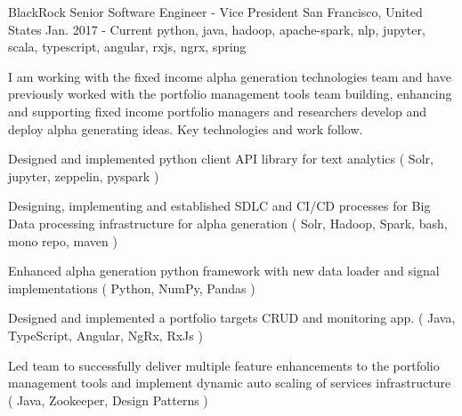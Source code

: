 \cventry
    {BlackRock} %
    {Senior Software Engineer - Vice President} %
    {San Francisco, United States} %
    {Jan. 2017 - Current} %
    { python, java, hadoop, apache-spark, nlp, jupyter, scala, typescript, angular, rxjs, ngrx, spring} %
    {
        I am working with the fixed income alpha generation technologies team and have previously worked with the portfolio management tools team building,
        enhancing and supporting fixed income portfolio managers and researchers develop and deploy alpha generating ideas. Key technologies and work follow.
    \begin{cvitems} %
        \item { Designed and implemented python client API library for text analytics ( Solr, jupyter, zeppelin, pyspark )}
        \item { Designing, implementing and established SDLC and CI/CD processes for Big Data processing infrastructure for alpha generation ( Solr, Hadoop, Spark,
        bash, mono repo, maven ) }
        \item { Enhanced alpha generation python framework with new data loader and signal implementations ( Python, NumPy, Pandas )}
        \item { Designed and implemented a portfolio targets CRUD and monitoring app. ( Java, TypeScript, Angular, NgRx, RxJs )  }
        \item { Led team to successfully deliver multiple feature enhancements to the portfolio management tools and implement dynamic auto scaling of services
        infrastructure ( Java, Zookeeper, Design Patterns )}
    \end{cvitems}
    }





